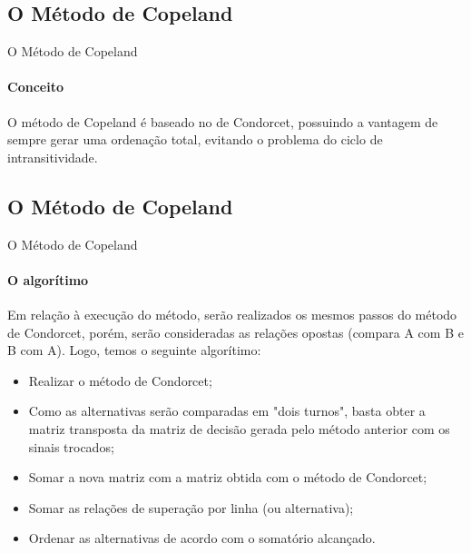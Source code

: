 \documentclass[aspectratio=169]{beamer}
\begin{document}
\subsection{O Método de Copeland}
\begin{frame}{O Método de Copeland}
\framesubtitle{Conceito}
O método de Copeland é baseado no de Condorcet, possuindo a vantagem de sempre gerar uma ordenação total, evitando o problema do ciclo de intransitividade. \cite{Gomes2011}

\end{frame}

\subsection{O Método de Copeland}
\begin{frame}{O Método de Copeland}
\framesubtitle{O algorítimo}
Em relação à execução do método, serão realizados os mesmos passos do método de Condorcet, porém, serão consideradas as relações opostas (compara A com B e B com A).
Logo, temos o seguinte algorítimo:
\begin{itemize}
    \item Realizar o método de Condorcet;
    \item Como as alternativas serão comparadas em "dois turnos", basta obter a matriz transposta da matriz de decisão gerada pelo método anterior com os sinais trocados;
    \item Somar a nova matriz com a matriz obtida com o método de Condorcet;
    \item Somar as relações de superação por linha (ou alternativa);
    \item Ordenar as alternativas de acordo com o somatório alcançado.
\end{itemize}

\end{frame}
\end{document}

